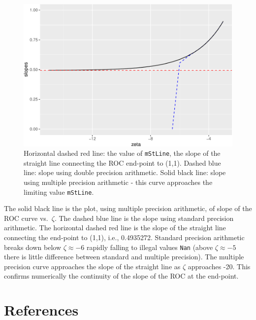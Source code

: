 \documentclass[
]{book}
\begin{document}
\begin{figure}
\centering
\includegraphics{17a-rsm-predictions_files/figure-latex/rsm-pred-plots1-1.pdf}
\caption{\label{fig:rsm-pred-plots1}Horizontal dashed red line: the value of \texttt{mStLine}, the slope of the straight line connecting the ROC end-point to (1,1). Dashed blue line: slope using double precision arithmetic. Solid black line: slope using multiple precision arithmetic - this curve approaches the limiting value \texttt{mStLine}.}
\end{figure}

The solid black line is the plot, using multiple precision arithmetic, of slope of the ROC curve vs.~\(\zeta\). The dashed blue line is the slope using standard precision arithmetic. The horizontal dashed red line is the slope of the straight line connecting the end-point to (1,1), i.e., 0.4935272. Standard precision arithmetic breaks down below \(\zeta \approx -6\) rapidly falling to illegal values \texttt{Nan} (above \(\zeta \approx -5\) there is little difference between standard and multiple precision). The multiple precision curve approaches the slope of the straight line as \(\zeta\) approaches -20. This confirms numerically the continuity of the slope of the ROC at the end-point.

\hypertarget{rsm-pred-references}{%
\section{References}\label{rsm-pred-references}}
\end{document}
